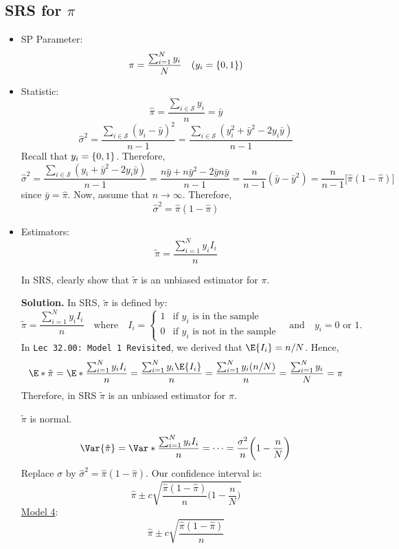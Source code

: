 \subsection*{SRS for $ \pi $}
\begin{itemize}
    \item SP Parameter:
          \[ \pi=\frac{\sum_{i=1}^{N} y_i}{N}\quad(y_i=\set{0,1}) \]
    \item Statistic:
          \[ \hat{\pi}=\frac{\sum_{i\in\mathcal{S}}y_i }{n}=\bar{y}  \]
          \[ \hat{\sigma}^2=\frac{\sum_{i\in\mathcal{S}}(y_i-\bar{y})^2}{n-1}=
              \frac{\sum_{i\in\mathcal{S}}(y_i^2+\bar{y}^2-2y_i\bar{y})}{n-1}    \]
          Recall that $ y_i=\set{0,1} $. Therefore,
          \[ \hat{\sigma}^2=
              \frac{\sum_{i\in\mathcal{S}}(y_i+\bar{y}^2-2y_i\bar{y})}{n-1}
              =\frac{n\bar{y}+n\bar{y}^2-2\bar{y}n\bar{y}}{n-1}
              =\frac{n}{n-1} (\bar{y}-\bar{y}^2)=\frac{n}{n-1} \bigl[\hat{\pi}(1-\hat{\pi})\bigr]  \]
          since $ \bar{y}=\hat{\pi} $. Now, assume that $ n\to\infty $. Therefore,
          \[ \hat{\sigma}^2=\hat{\pi}(1-\hat{\pi}) \]
    \item Estimators:
          \[ \tilde{\pi}=\frac{\sum_{i=1}^{N} y_i I_i}{n} \]
          \begin{Exercise}{}{}
              In SRS, clearly show that $ \tilde{\pi} $ is an unbiased estimator for $ \pi $.

              \textbf{Solution.} In SRS, $\tilde{\pi}$ is defined by:
              \[ \tilde{\pi}=\frac{\sum_{i=1}^N y_i I_i}{n}\quad\text{where}\quad I_i =\begin{cases}
                      1 & \text{if $y_i$ is in the sample}     \\
                      0 & \text{if $y_i$ is not in the sample}
                  \end{cases}\quad \text{and}\quad y_i=0\text{ or }1. \]
              In \texttt{Lec 32.00: Model 1 Revisited},
              we derived that $\E{I_i}=n/N$.
              Hence,
              \[
                  \E*{\tilde{\pi}}
                  =\E*{\frac{\sum_{i=1}^N y_i I_i}{n}}
                  =\frac{\sum_{i=1}^N y_i\E{I_i}}{n}
                  =\frac{\sum_{i=1}^N y_i(n/N)}{n}
                  =\frac{\sum_{i=1}^N y_i}{N}
                  =\pi
              \]
              Therefore, in SRS $\tilde{\pi}$ is an unbiased estimator for $\pi$.
          \end{Exercise}
          \begin{Remark}{}{}
              $ \tilde{\pi} $ is normal.
          \end{Remark}
          \[
              \Var{\tilde{\pi}}
              =\Var*{\frac{\sum_{i=1}^{N} y_i I_i}{n}}
              =\cdots
              =\frac{\sigma^2}{n} \biggl(1-\frac{n}{N}\biggr)
          \]
          Replace $ \sigma $ by $ \hat{\sigma}^2=\hat{\pi}(1-\hat{\pi}) $.
          Our confidence interval is:
          \[ \hat{\pi}\pm c\sqrt{\frac{\hat{\pi}(1-\hat{\pi})}{n}\biggl(1-\frac{n}{N}\biggr)} \]
          \underline{Model 4}:
          \[ \hat{\pi}\pm c\sqrt{\frac{\hat{\pi}(1-\hat{\pi})}{n}} \]
\end{itemize}
